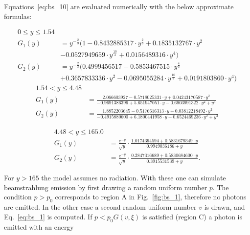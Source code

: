 Equations~\ref{eq:bs_10} are evaluated numerically with the below approximate formulas:

\begin{equation}
	\begin{split}
	0 \leq y \leq 1.54 & \\
	G_1(y) & = y^{-\frac{2}{3}} (1 - 0.8432885317\cdot y^{\frac{2}{3}} + 0.1835132767\cdot y^2 \\
	& - 0.0527949659\cdot y^{\frac{10}{3}} + 0.0156489316\cdot y^4) \\
	G_2(y) & = y^{-\frac{2}{3}} (0.4999456517 - 0.5853467515\cdot y^{\frac{4}{3}} \\
	& + 0.3657833336\cdot y^2 - 0.0695055284\cdot y^{\frac{10}{3}} + 0.0191803860\cdot y^4) 	\end{split}
\label{eq:bs_11}
\end{equation}
\begin{equation}
	\begin{split}
	1.54 < y \leq 4.48 & \\	
	G_1(y) & = \frac{2.066603927 - 0.5718025331\cdot y + 0.04243170587\cdot y^2}{-0.9691386396 + 5.651947051\cdot y - 0.6903991322\cdot y^2 + y^3} \\
	G_2(y) & = \frac{1.8852203645 - 0.5176616313\cdot y + 0.03812218492\cdot y^2}{-0.4915880600 + 6.1800441958\cdot y - 0.6524469236\cdot y^2 + y^3}
	\end{split}
\label{eq:bs_12}
\end{equation}

\begin{equation}
\begin{split}
	4.48 < y \leq 165.0 & \\	
	G_1(y) & = 	\frac{e^{-y}}{\sqrt{y}}\cdot \frac{1.0174394594 + 0.5831679349\cdot y}{0.9949036186 + y} \\
	G_2(y) & = \frac{e^{-y}}{\sqrt{y}}\cdot \frac{0.2847316689 + 0.5830684600\cdot y}{0.3915531539 + y}.
	\end{split}
 	\label{eq:bs_13}
\end{equation}

For $y>165$ the model assumes no radiation. With these one can simulate beamstrahlung emission by first drawing a random uniform number $p$. The condition $p>p_0$ corresponds to region A in Fig.~\ref{fig:bs_1}, therefore no photons are emitted. In the other case a second random uniform number $v$ is drawn, and Eq.~\ref{eq:bs_1} is computed. If $p<p_0G(v,\xi)$ is satisfied (region C) a photon is emitted with an energy

